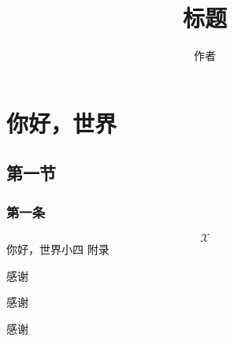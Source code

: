 \documentclass{LZU}
\title{{标}{题}}
\author{作者}
\begin{document}
\maketitle
\makestatement
\frontmatter
\tableofcontents
\mainmatter
\chapter{你好，世界}
\section{第一节}
\subsection{第一条}
\[\mathcal{X}\]
你好，世界\supercite{latextutorial}{小四}
\backmatter
\printbibliography[title={参考文献},heading=bibintoc]
\Appendix
附录
\Thanks
\par 感谢 \par 感谢 \par 感谢
\renewcommand{\supervisorcomment}{%
不错哟。

我很欣赏你。为什么说它有点品质，注意看一下衬衫露出领口的高度，看看衬衫领口的伏
贴，衬衫的法式袖剪裁，面料在灯光下的质感，手抬起时西装肩部的滑顺度，一件好的正
装不要求多贵，要的是你看起来没有违和感。%
}
\renewcommand{\recommendedgrade}{97}
\renewcommand{\supervisorsignature}{%
    \raisebox{-10pt}{%
        \texttt{[image: pic/signature.pdf]}%
    }%
}
\renewcommand{\committeecomment}{不错}
\renewcommand{\finalgrade}{100}
\Grade
\end{document}
